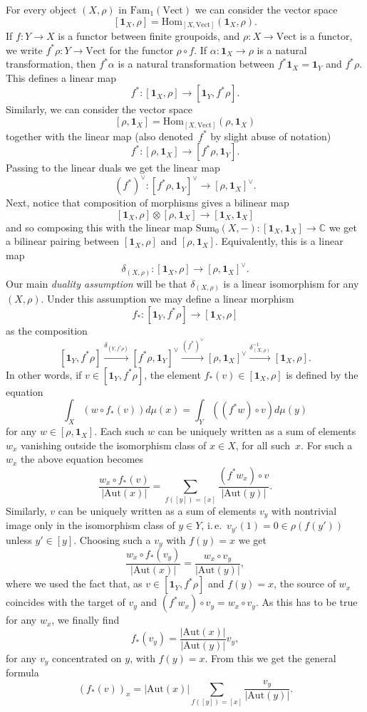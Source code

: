 \documentclass[12pt]{scrartcl}
\theoremstyle{definition}
\numberwithin{equation}{section}
\numberwithin{definition}{section}
\numberwithin{figure}{section}
\begin{document}
For every object $(X,\rho)$ in $\mathrm{Fam}_1(\mathrm{Vect})$ we can consider the vector space 
\[
[\mathbf{1}_X,\rho]=\mathrm{Hom}_{[X,\mathrm{Vect}]}(\mathbf{1}_X,\rho).
\]
If $f\colon Y\to X$ is a functor between finite groupoids, and $\rho\colon X\to \mathrm{Vect}$ is a functor, we write $f^*\rho\colon Y\to \mathrm{Vect}$ for the functor $\rho\circ f$. If $\alpha\colon \mathbf{1}_X\to \rho$ is a natural transformation, then $f^*\alpha$ is a natural transformation between $f^*\mathbf{1}_X=\mathbf{1}_Y$ and $f^*\rho$. This defines a linear map
\[
f^* \colon [\mathbf{1}_X,\rho] \to [\mathbf{1}_Y, f^*\rho].
\]
Similarly, we can consider the vector space
\[
[\rho,\mathbf{1}_X]=\mathrm{Hom}_{[X,\mathrm{Vect}]}(\rho, \mathbf{1}_X)
\]
together with the linear map (also denoted~$f^*$ by slight abuse of notation) 
\[
f^* \colon [\rho,\mathbf{1}_X] \to [f^*\rho,\mathbf{1}_Y].
\]
Passing to the linear duals we get the linear map
\[
(f^*)^\vee\colon [f^*\rho,\mathbf{1}_Y]^\vee \to [\rho,\mathbf{1}_X]^\vee.
\]
Next, notice that composition of morphisms gives a bilinear map
\[
[\mathbf{1}_X,\rho]\otimes [\rho,\mathbf{1}_X]\to [\mathbf{1}_X,\mathbf{1}_X]
\]
and so composing this with the linear map $\mathrm{Sum}_0(X,-)\colon [\mathbf{1}_X,\mathbf{1}_X]\to \mathbb{C}$ we get a bilinear pairing between $[\mathbf{1}_X,\rho]$ and $[\rho,\mathbf{1}_X]$. Equivalently, this is a linear map
\[
\delta_{(X,\rho)}\colon [\mathbf{1}_X,\rho]\to [\rho,\mathbf{1}_X]^\vee.
\]
Our main \emph{duality assumption} will be that $\delta_{(X,\rho)}$ is a linear isomorphism for any $(X,\rho)$. Under this assumption we may define a linear morphism 
\[
f_*\colon [\mathbf{1}_Y,f^*\rho]\to  [\mathbf{1}_X,\rho]
\]
as the composition
\[
[\mathbf{1}_Y,f^*\rho]\xrightarrow{\delta_{(Y,f^*\rho)}}[f^*\rho,\mathbf{1}_Y]^\vee \xrightarrow{(f^*)^\vee} [\rho,\mathbf{1}_X]^\vee \xrightarrow{\delta_{(X,\rho)}^{-1}} [\mathbf{1}_X,\rho].
\]
In other words, if $v\in [\mathbf{1}_Y,f^*\rho]$, the element $f_*(v)\in [\mathbf{1}_X,\rho]$ is defined by the equation
\[
\int_X (w\circ f_*(v)) d\mu(x) = \int_Y((f^*w)\circ v) d\mu(y)
\]
for any $w\in [\rho,\mathbf{1}_X]$. Each such $w$ can be uniquely written as a sum of elements $w_x$ vanishing outside the isomorphism class of $x \in X$, for all such~$x$. For such a $w_x$ the above equation becomes
\[
\frac{w_x\circ f_*(v)}{|\mathrm{Aut}(x)|} = \sum_{f([y])=[x]}\frac{(f^*w_x)\circ v} {|\mathrm{Aut}(y)|}.
\]
	Similarly, $v$ can be uniquely written as a sum of elements $v_y$ with nontrivial image only in the isomorphism class of $y \in Y$, i.\,e.\ $v_{y'}(1) = 0 \in \rho(f(y'))$ unless $y' \in [y]$. 
Choosing such a $v_y$ with $f(y)=x$ we get
\[
\frac{w_x\circ f_*(v_y)}{|\mathrm{Aut}(x)|} = \frac{w_x\circ v_y} {|\mathrm{Aut}(y)|},
\]
where we used the fact that, as $v\in [\mathbf{1}_Y,f^*\rho]$ and $f(y)=x$, the source of $w_x$ coincides with the target of $v_y$ and $(f^*w_x)\circ v_y=w_x\circ v_y$. As this has to be true for any $w_x$, we finally find
\[
f_*(v_y)= \frac{|\mathrm{Aut}(x)| } {|\mathrm{Aut}(y)|}v_y,
\]
for any $v_y$ concentrated on $y$, with $f(y)=x$. From this we get the general formula
\[
(f_*(v))_x=|\mathrm{Aut}(x)|\sum_{f([y])=[x]}\frac{v_y}{|\mathrm{Aut}(y)|}.
\]
\end{document}
